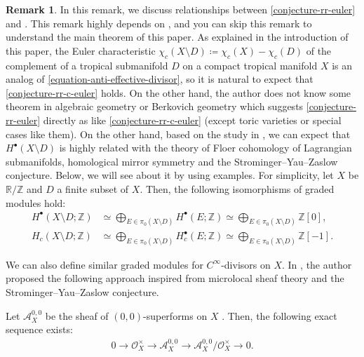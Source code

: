 \documentclass[a4paper,dvipdfmx,reqno,12pt]{amsart}
\theoremstyle{definition}
\newtheorem{remark}[theorem]{Remark}
\newcommand{\deq}{\coloneqq}
\numberwithin{equation}{section}
\begin{document}
\begin{remark}
\label{remark-c-infinity-divisor}
In this remark, we discuss relationships
between \cref{conjecture-rr-euler} and 
\cite{tsutsui2023graded}.
This remark highly depends on
\cite{tsutsui2023graded}, and you can
skip this remark to understand the main theorem of  
this paper. As explained in the introduction of this paper,
the Euler characteristic 
$\chi_c(X\setminus D)\deq \chi_c(X)-\chi_c(D)$ of 
the complement of a tropical submanifold $D$ on
a compact tropical manifold $X$ is an analog of  
\cref{equation-anti-effective-divisor}, so 
it is natural to expect that \cref{conjecture-rr-c-euler} holds.
On the other hand, the author does not know some theorem
in algebraic geometry or Berkovich geometry
which suggests \cref{conjecture-rr-euler} directly
as like \cref{conjecture-rr-c-euler}
(except toric varieties or special cases like them).
On the other hand, based on the study in \cite{tsutsui2023graded},
we can expect that 
$H^{\bullet}(X\setminus D)$ is highly related with
the theory of Floer cohomology of
Lagrangian submanifolds, homological mirror symmetry
and the Strominger--Yau--Zaslow conjecture.
Below, we will see about it by using examples. 
For simplicity, let 
$X$ be $\mathbb{R}/\mathbb{Z}$ and $D$ a finite subset of
$X$. Then, the following isomorphisms of graded modules hold:
\begin{align}
H^{\bullet}(X\setminus D;\mathbb{Z}) 
&\simeq \bigoplus_{E\in \pi_0(X\setminus D)} 
H^{\bullet}(E;\mathbb{Z})
\simeq \bigoplus_{E\in \pi_0(X\setminus D)} \mathbb{Z}[0], \\
H_c(X\setminus D;\mathbb{Z}) 
&\simeq \bigoplus_{E\in \pi_0(X\setminus D)} 
H^{\bullet}_c(E;\mathbb{Z})
\simeq \bigoplus_{E\in \pi_0(X\setminus D)} \mathbb{Z}[-1].
\end{align}

We can also define similar graded modules
for $C^{\infty}$-divisors on $X$.
In \cite{tsutsui2023graded},
the author proposed the following approach
inspired from microlocal sheaf theory and
the Strominger--Yau--Zaslow conjecture.

Let $\mathcal{A}^{0,0}_X$ be the sheaf of
$(0,0)$-superforms on $X$
\cite[Definition 2.24]{MR3903579}.
Then, the following exact sequence exists:
\begin{align}
0\to \mathcal{O}_X^{\times} \to \mathcal{A}^{0,0}_X
\to \mathcal{A}^{0,0}_X/\mathcal{O}_X^{\times} \to 0.
\end{align}


\end{remark}
\end{document}
